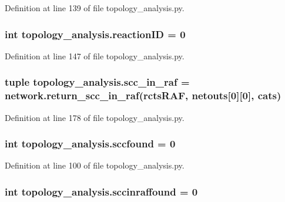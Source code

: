 Definition at line 139 of file topology\+\_\+analysis.\+py.

\hypertarget{a00159_a07d632b487fabd051ab725ee95a85368}{
\subsubsection[{reaction\+I\+D}]{\setlength{\rightskip}{0pt plus 5cm}int topology\+\_\+analysis.\+reaction\+I\+D = 0}}\label{a00159_a07d632b487fabd051ab725ee95a85368}


Definition at line 147 of file topology\+\_\+analysis.\+py.

\hypertarget{a00159_ac864e2a75b705766c1d81f68897f52c0}{
\subsubsection[{scc\+\_\+in\+\_\+raf}]{\setlength{\rightskip}{0pt plus 5cm}tuple topology\+\_\+analysis.\+scc\+\_\+in\+\_\+raf = network.\+return\+\_\+scc\+\_\+in\+\_\+raf({\bf rcts\+R\+A\+F}, {\bf netouts}\mbox{[}0\mbox{]}\mbox{[}0\mbox{]}, cats)}}\label{a00159_ac864e2a75b705766c1d81f68897f52c0}


Definition at line 178 of file topology\+\_\+analysis.\+py.

\hypertarget{a00159_aa8258ef828502be89350332ae97a0d3a}{
\subsubsection[{sccfound}]{\setlength{\rightskip}{0pt plus 5cm}int topology\+\_\+analysis.\+sccfound = 0}}\label{a00159_aa8258ef828502be89350332ae97a0d3a}


Definition at line 100 of file topology\+\_\+analysis.\+py.

\hypertarget{a00159_a3dd0e59d1fb4786b4bec44f325585eb6}{
\subsubsection[{sccinraffound}]{\setlength{\rightskip}{0pt plus 5cm}int topology\+\_\+analysis.\+sccinraffound = 0}}\label{a00159_a3dd0e59d1fb4786b4bec44f325585eb6}


